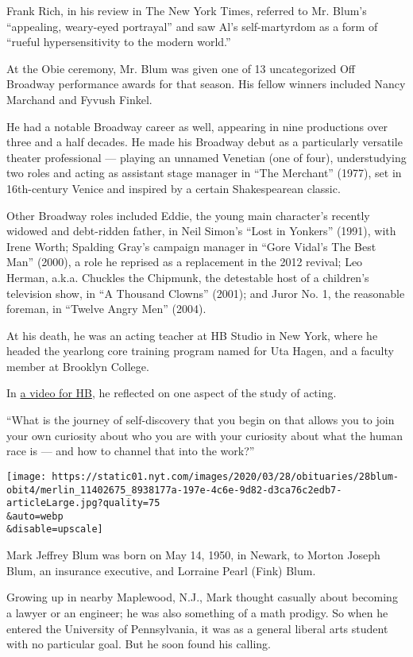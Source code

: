 Frank Rich, in his review in The New York Times, referred to Mr. Blum's
``appealing, weary-eyed portrayal'' and saw Al's self-martyrdom as a
form of ``rueful hypersensitivity to the modern world.''

At the Obie ceremony, Mr. Blum was given one of 13 uncategorized Off
Broadway performance awards for that season. His fellow winners included
Nancy Marchand and Fyvush Finkel.

He had a notable Broadway career as well, appearing in nine productions
over three and a half decades. He made his Broadway debut as a
particularly versatile theater professional --- playing an unnamed
Venetian (one of four), understudying two roles and acting as assistant
stage manager in ``The Merchant'' (1977), set in 16th-century Venice and
inspired by a certain Shakespearean classic.

Other Broadway roles included Eddie, the young main character's recently
widowed and debt-ridden father, in Neil Simon's ``Lost in Yonkers''
(1991), with Irene Worth; Spalding Gray's campaign manager in ``Gore
Vidal's The Best Man'' (2000), a role he reprised as a replacement in
the 2012 revival; Leo Herman, a.k.a. Chuckles the Chipmunk, the
detestable host of a children's television show, in ``A Thousand
Clowns'' (2001); and Juror No. 1, the reasonable foreman, in ``Twelve
Angry Men'' (2004).

At his death, he was an acting teacher at HB Studio in New York, where
he headed the yearlong core training program named for Uta Hagen, and a
faculty member at Brooklyn College.

In \href{https://www.youtube.com/watch?v=ljmH5R2qCjo}{a video for HB},
he reflected on one aspect of the study of acting.

``What is the journey of self-discovery that you begin on that allows
you to join your own curiosity about who you are with your curiosity
about what the human race is --- and how to channel that into the
work?''

\texttt{[image: https://static01.nyt.com/images/2020/03/28/obituaries/28blum-obit4/merlin\_11402675\_8938177a-197e-4c6e-9d82-d3ca76c2edb7-articleLarge.jpg?quality=75\\\&auto=webp\\\&disable=upscale]}

Mark Jeffrey Blum was born on May 14, 1950, in Newark, to Morton Joseph
Blum, an insurance executive, and Lorraine Pearl (Fink) Blum.

Growing up in nearby Maplewood, N.J., Mark thought casually about
becoming a lawyer or an engineer; he was also something of a math
prodigy. So when he entered the University of Pennsylvania, it was as a
general liberal arts student with no particular goal. But he soon found
his calling.

